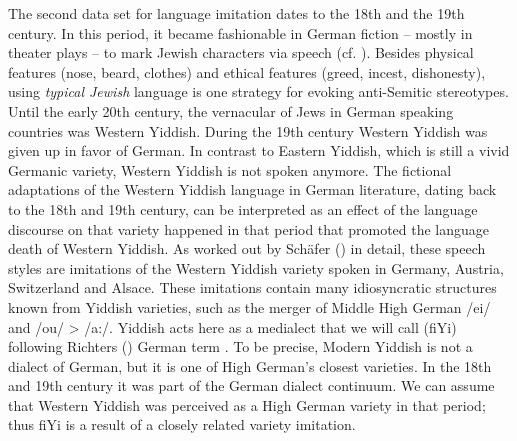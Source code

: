 \documentclass[output=paper]{LSP/langsci}
\begin{document}
The second data set for language imitation dates to the 18th and the 19th century. In this period, it became fashionable in German fiction – mostly in theater plays – to mark Jewish characters via speech (cf. \cite{richter_sprache_1995}). Besides physical features (nose, beard, clothes) and ethical features (greed, incest, dishonesty), using \textit{typical Jewish} language is one strategy for evoking anti-Semitic stereotypes.
  Until the early 20th century, the vernacular of Jews in German speaking countries was  Western Yiddish. During the 19th century Western Yiddish was given up in favor of German. In contrast to Eastern Yiddish, which is still a vivid Germanic variety, Western Yiddish is not spoken anymore. The fictional adaptations of the Western Yiddish language in German literature, dating back to the 18th and 19th century, can be interpreted as an effect of the language discourse on that variety happened in that period that promoted the language death of Western Yiddish.
   As worked out by Sch\"afer (\citeyear{SchaeferDiss}) in detail, these speech styles are imitations of the Western Yiddish variety spoken in Germany, Austria,  Switzerland and  Alsace. These imitations contain many idiosyncratic structures known from Yiddish varieties, such as the merger of Middle High German /ei/ and /ou/ > /a:/. Yiddish acts here as a medialect that we will call  (fiYi) following Richters (\citeyear{richter_sprache_1995}) German term . To be precise, Modern Yiddish is not a dialect of German, but it is one of High German’s closest varieties. In the 18th and 19th century it was part of the German dialect continuum. We can assume that Western Yiddish was perceived as a High German variety in that period; thus fiYi is a result of a closely related variety imitation.
\end{document}
